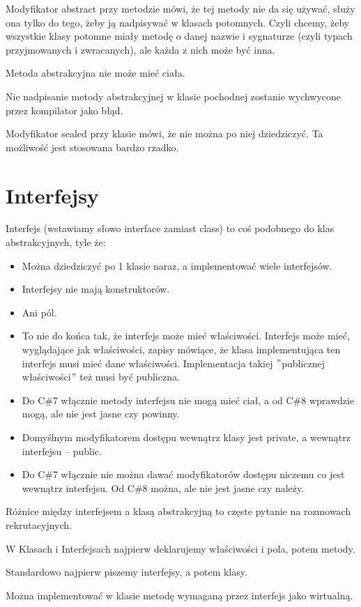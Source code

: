 \documentclass[10pt]{article}
\begin{document}
Modyfikator abstract przy metodzie mówi, że tej metody nie da się używać, służy ona tylko do tego, żeby ją nadpisywać w klasach potomnych. Czyli chcemy, żeby wszystkie klasy potomne miały metodę o danej nazwie i sygnaturze (czyli typach przyjmowanych i zwracanych), ale każda z nich może być inna.

Metoda abstrakcyjna nie może mieć ciała.

Nie nadpisanie metody abstrakcyjnej w klasie pochodnej zostanie wychwycone przez kompilator jako błąd.

Modyfikator sealed przy klasie mówi, że nie można po niej dziedziczyć. Ta możliwość jest stosowana bardzo rzadko.

\section{Interfejsy}
Interfejs (wstawiamy słowo interface zamiast class) to coś podobnego do klas abstrakcyjnych, tyle że:
\begin{itemize}
\item Można dziedziczyć po 1 klasie naraz, a implementować wiele interfejsów.
\item Interfejsy nie mają konstruktorów.
\item Ani pól.
\item To nie do końca tak, że interfejs może mieć właściwości. Interfejs może mieć, wyglądające jak właściwości, zapisy mówiące, że klasa implementująca ten interfejs musi mieć dane właściwości. Implementacja takiej $"$publicznej właściwości$"$ też musi być publiczna.
\item Do C\#7 włącznie metody interfejsu nie mogą mieć ciał, a od C\#8 wprawdzie mogą, ale nie jest jasne czy powinny.
\item Domyślnym modyfikatorem dostępu wewnątrz klasy jest private, a wewnątrz interfejsu -- public.
\item Do C\#7 włącznie nie można dawać modyfikatorów dostępu niczemu co jest wewnątrz interfejsu. Od C\#8 można, ale nie jest jasne czy należy.
\end{itemize}
Różnice między interfejsem a klasą abstrakcyjną to częste pytanie na rozmowach rekrutacyjnych.

W Klasach i Interfejsach najpierw deklarujemy właściwości i pola, potem metody.

Standardowo najpierw piszemy interfejsy, a potem klasy.

Można implementować w klasie metodę wymaganą przez interfejs jako wirtualną.
\end{document}
